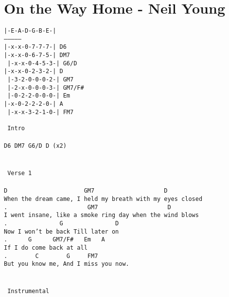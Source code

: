 \newpage
\section{On the Way Home - Neil Young}
\label{On the Way Home - Neil Young}
\texttt{|-E-A-D-G-B-E-|\\
---------------\\
|-x-x-0-7-7-7-|\  D6\ \ \ \\
|-x-x-0-6-7-5-|\  DM7\ \ \\\
|-x-x-0-4-5-3-|\  G6/D\ \ \\
|-x-x-0-2-3-2-|\  D\ \ \ \\\
|-3-2-0-0-0-2-|\  GM7\ \ \\\
|-2-x-0-0-0-3-|\  GM7/F\#\\\
|-0-2-2-0-0-0-|\  Em\ \ \ \\
|-x-0-2-2-2-0-|\  A\ \ \ \\\
|-x-x-3-2-1-0-|\  FM7\ \ \\\
\\
\lbrack\ Intro\rbrack\\
\\
D6\ DM7\ G6/D\ D\ (x2)\\
\\
\\
\lbrack\ Verse\ 1\rbrack\\
\\
D\ \ \ \ \ \ \ \ \ \ \ \ \ \ \ \ \ \ \ \ \ \ GM7\ \ \ \ \ \ \ \ \ \ \ \ \ \ \ \ \ \ \ \ D\\
When\ the\ dream\ came,\ I\ held\ my\ breath\ with\ my\ eyes\ closed\\
.\ \ \ \ \ \ \ \ \ \ \ \ \ \ \ \ \ \ \ \ \ \ \ GM7\ \ \ \ \ \ \ \ \ \ \ \ \ \ \ \ \ \ \ \ D\\
I\ went\ insane,\ like\ a\ smoke\ ring\ day\ when\ the\ wind\ blows\\
.\ \ \ \ \ \ \ \ \ \ \ \ \ \ \ G\ \ \ \ \ \ \ \ \ \ \ \ \ \ \ D\\
Now\ I\ won't\ be\ back\ Till\ later\ on\ \\
.\ \ \ \ \ \ G\ \ \ \ \ \ GM7/F\#\ \ \ Em\ \ \ A\\
If\ I\ do\ come\ back\ at\ all\\
.\ \ \ \ \ \ \ \ C\ \ \ \ \ \ \ \ G\ \ \ \ \ FM7\\
But\ you\ know\ me,\ And\ I\ miss\ you\ now.\\
\\
\\
\lbrack\ Instrumental\rbrack\\
\\
}
